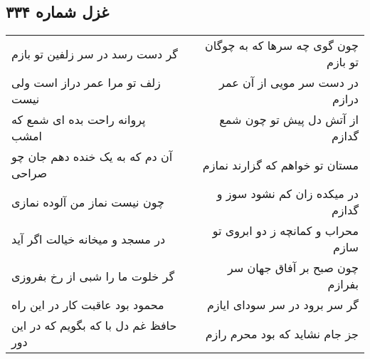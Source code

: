 \begin{center}
\section*{غزل شماره ۳۳۴}
\label{sec:sh334}
\begin{longtable}{l p{0.5cm} r}
گر دست رسد در سر زلفین تو بازم
&&
چون گوی چه سرها که به چوگان تو بازم
\\
زلف تو مرا عمر دراز است ولی نیست
&&
در دست سر مویی از آن عمر درازم
\\
پروانه راحت بده ای شمع که امشب
&&
از آتش دل پیش تو چون شمع گدازم
\\
آن دم که به یک خنده دهم جان چو صراحی
&&
مستان تو خواهم که گزارند نمازم
\\
چون نیست نماز من آلوده نمازی
&&
در میکده زان کم نشود سوز و گدازم
\\
در مسجد و میخانه خیالت اگر آید
&&
محراب و کمانچه ز دو ابروی تو سازم
\\
گر خلوت ما را شبی از رخ بفروزی
&&
چون صبح بر آفاق جهان سر بفرازم
\\
محمود بود عاقبت کار در این راه
&&
گر سر برود در سر سودای ایازم
\\
حافظ غم دل با که بگویم که در این دور
&&
جز جام نشاید که بود محرم رازم
\\
\end{longtable}
\end{center}
